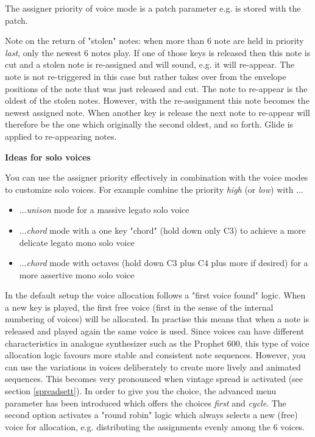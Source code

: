 The assigner priority of voice mode is a patch parameter e.g. is stored with the patch. 

Note on the return of "stolen" notes: when more than 6 note are held in priority \textit{last}, only the newest 6 notes play. If one of those keys is released then this note is cut and a stolen note is re-assigned and will sound, e.g. it will re-appear. The note is not re-triggered in this case but rather takes over from the envelope positions of the note that was just released and cut. The note to re-appear is the oldest of the stolen notes. However, with the re-assignment this note becomes the newest assigned note. When another key is release the next note to re-appear will therefore be the one which originally the second oldest, and so forth. Glide is applied to re-appearing notes.

\textbf{Ideas for solo voices}

You can use the assigner priority effectively in combination with the voice modes to customize solo voices. For example combine the priority \textit{high} (or \textit{low}) with ...
\begin{itemize}
  \item ...\textit{unison} mode for a massive legato solo voice
  \item ...\textit{chord} mode with a one key "chord" (hold down only C3) to achieve a more delicate legato mono solo voice
  \item ...\textit{chord} mode with octaves (hold down C3 plus C4 plus more if desired) for a more assertive mono solo voice   
\end{itemize}

In the default setup the voice allocation follows a "first voice found" logic. When a new key is played, the first free voice (first in the sense of the internal numbering of voices) will be allocated. In practise this means that when a note is released and played again the same voice is used. Since voices can have different characteristics in analogue synthesizer such as the Prophet 600, this type of voice allocation logic favours more stable and consistent note sequences. However, you can use the variations in voices deliberately to create more lively and animated sequences. This becomes very pronounced when vintage spread is activated (see section \ref{spreadsett}). In order to give you the choice, the advanced menu parameter \assign has been introduced which offers the choices \textit{first} and \textit{cycle}. The second option activates a "round robin" logic which always selects a new (free) voice for allocation, e.g. distributing the assignments evenly among the 6 voices.   

